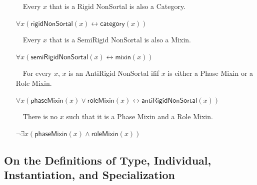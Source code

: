 \documentclass{article}
\newcommand{\AxLabel}{a}
\newcounter{cntax}
\newcommand{\myax}[1]{\refstepcounter{cntax}{\bf \small \AxLabel\thecntax}\label{#1}$\,\,\,\,$}
\newcommand{\me}[1]{\textsf{#1}}
\begin{document}
\begin{itemize}
    

    \item[\myax{ax_rigidNonSortal_taxonomy}] Every $x$ that is a \me{Rigid NonSortal} is also a \me{Category}.
    
    $\forall x(\textsf{rigidNonSortal}(x)\leftrightarrow \textsf{category}(x))$
    
    

    \item[\myax{ax_semiRigidNonSortal_taxonomy}] Every $x$ that is a \me{SemiRigid NonSortal} is also a \me{Mixin}.
    
    $\forall x(\textsf{semiRigidNonSortal}(x)\leftrightarrow \textsf{mixin}(x))$
    
    

    \item[\myax{ax_antiRigidNonSortal_taxonomy}] For every $x$, $x$ is an \me{AntiRigid NonSortal} ifif $x$ is either a \me{Phase Mixin} or a \me{Role Mixin}.
    
    $\forall x(\textsf{phaseMixin}(x)\vee \textsf{roleMixin}(x)\leftrightarrow \textsf{antiRigidNonSortal}(x))$
    
    
    
    \item[\myax{ax_antiRigidNonSortal_partition}] There is no $x$ such that it is a \me{Phase Mixin} and a \me{Role Mixin}.
    
    $\neg \exists x(\textsf{phaseMixin}(x)\wedge \textsf{roleMixin}(x))$
    
    
\end{itemize}



\subsection{On the Definitions of \me{Type}, \me{Individual}, Instantiation, and Specialization}
\end{document}
